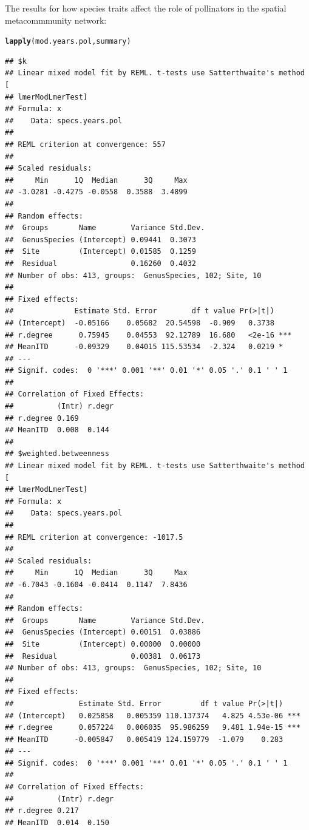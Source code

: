 \documentclass{article}\usepackage[]{graphicx}\usepackage[]{color}
\makeatletter
\newcommand{\hlstd}[1]{\textcolor[rgb]{0.345,0.345,0.345}{#1}}%
\newcommand{\hlkwd}[1]{\textcolor[rgb]{0.737,0.353,0.396}{\textbf{#1}}}%
\newenvironment{kframe}{%
 \def\at@end@of@kframe{}%
 \ifinner\ifhmode%
  \def\at@end@of@kframe{\end{minipage}}%
  \begin{minipage}{\columnwidth}%
 \fi\fi%
 \def\FrameCommand##1{\hskip\@totalleftmargin \hskip-\fboxsep
 \colorbox{shadecolor}{##1}\hskip-\fboxsep
     \hskip-\linewidth \hskip-\@totalleftmargin \hskip\columnwidth}%
 \MakeFramed {\advance\hsize-\width
   \@totalleftmargin\z@ \linewidth\hsize
   \@setminipage}}%
 {\par\unskip\endMakeFramed%
 \at@end@of@kframe}
\newenvironment{knitrout}{}{} %
\makeatother
\begin{document}
The results for how species traits affect the role of pollinators in
the spatial metacommmunity network: 
\begin{knitrout}
\color{fgcolor}\begin{kframe}
\begin{alltt}
\hlkwd{lapply}\hlstd{(mod.years.pol, summary)}
\end{alltt}
\begin{verbatim}
## $k
## Linear mixed model fit by REML. t-tests use Satterthwaite's method [
## lmerModLmerTest]
## Formula: x
##    Data: specs.years.pol
## 
## REML criterion at convergence: 557
## 
## Scaled residuals: 
##     Min      1Q  Median      3Q     Max 
## -3.0281 -0.4275 -0.0558  0.3588  3.4899 
## 
## Random effects:
##  Groups       Name        Variance Std.Dev.
##  GenusSpecies (Intercept) 0.09441  0.3073  
##  Site         (Intercept) 0.01585  0.1259  
##  Residual                 0.16260  0.4032  
## Number of obs: 413, groups:  GenusSpecies, 102; Site, 10
## 
## Fixed effects:
##              Estimate Std. Error        df t value Pr(>|t|)    
## (Intercept)  -0.05166    0.05682  20.54598  -0.909   0.3738    
## r.degree      0.75945    0.04553  92.12789  16.680   <2e-16 ***
## MeanITD      -0.09329    0.04015 115.53534  -2.324   0.0219 *  
## ---
## Signif. codes:  0 '***' 0.001 '**' 0.01 '*' 0.05 '.' 0.1 ' ' 1
## 
## Correlation of Fixed Effects:
##          (Intr) r.degr
## r.degree 0.169        
## MeanITD  0.008  0.144 
## 
## $weighted.betweenness
## Linear mixed model fit by REML. t-tests use Satterthwaite's method [
## lmerModLmerTest]
## Formula: x
##    Data: specs.years.pol
## 
## REML criterion at convergence: -1017.5
## 
## Scaled residuals: 
##     Min      1Q  Median      3Q     Max 
## -6.7043 -0.1604 -0.0414  0.1147  7.8436 
## 
## Random effects:
##  Groups       Name        Variance Std.Dev.
##  GenusSpecies (Intercept) 0.00151  0.03886 
##  Site         (Intercept) 0.00000  0.00000 
##  Residual                 0.00381  0.06173 
## Number of obs: 413, groups:  GenusSpecies, 102; Site, 10
## 
## Fixed effects:
##               Estimate Std. Error         df t value Pr(>|t|)    
## (Intercept)   0.025858   0.005359 110.137374   4.825 4.53e-06 ***
## r.degree      0.057224   0.006035  95.986259   9.481 1.94e-15 ***
## MeanITD      -0.005847   0.005419 124.159779  -1.079    0.283    
## ---
## Signif. codes:  0 '***' 0.001 '**' 0.01 '*' 0.05 '.' 0.1 ' ' 1
## 
## Correlation of Fixed Effects:
##          (Intr) r.degr
## r.degree 0.217        
## MeanITD  0.014  0.150
\end{verbatim}
\end{kframe}
\end{knitrout}
\end{document}
